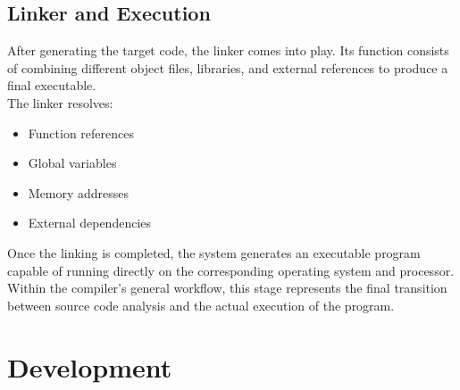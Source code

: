 \documentclass[letterpaper,12pt,oneside]{article}
\begin{document}
    \subsection{Linker and Execution}
    After generating the target code, the linker comes into play. Its function consists of combining different object files, libraries, and external references to produce a final executable. \\
    The linker resolves:
    \begin{itemize}
        \item Function references
        \item Global variables
        \item Memory addresses
        \item External dependencies
    \end{itemize}
    Once the linking is completed, the system generates an executable program capable of running directly on the corresponding operating system and processor.\\
    Within the compiler's general workflow, this stage represents the final transition between source code analysis and the actual execution of the program.







    

    


\section{Development}
\end{document}
